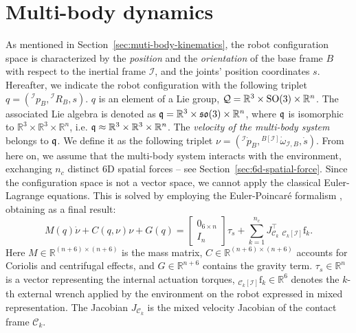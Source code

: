 \section{Multi-body dynamics}
\label{sec:multi-body-dynamics}
As mentioned in Section~\ref{sec:muti-body-kinematics}, the robot configuration space is characterized by the \emph{position} and the \emph{orientation} of the base frame $B$ with respect to the inertial frame $\mathcal{I}$, and the joints' position coordinates $s$. Hereafter, we indicate the robot configuration with the following triplet $q = ({}^{\mathcal{I}} p_B, {}^{\mathcal{I}} R_{B}, s)$. $q$ is an element of a Lie group, $\mathcal{Q} = \mathbb{R}^3 \times \mathrm{SO}(3) \times \mathbb{R}^n$. The associated Lie algebra is denoted as $\mathfrak{q} = \mathbb{R}^3 \times \mathfrak{so}(3) \times \mathbb{R}^n$, where $\mathfrak{q}$ is isomorphic to $\mathbb{R}^3 \times \mathbb{R}^3 \times \mathbb{R}^n$, i.e. $\mathfrak{q} \approx\mathbb{R}^3 \times \mathbb{R}^3 \times \mathbb{R}^n$. The \emph{velocity of the multi-body system} belongs to $\mathfrak{q}$. We define it as the following triplet $\nu = \left({}^{\mathcal{I}} \dot{p}_B, {}^{B[\mathcal{I}]}\dot{\omega}_{\mathcal{I}, B}, \dot{s}\right)$.
From here on, we assume that the multi-body system interacts with the environment, exchanging $n_c$ distinct 6D spatial forces -- see Section~\ref{sec:6d-spatial-force}. Since the configuration space is not a vector space, we cannot apply the classical Euler-Lagrange equations. This is solved by employing the Euler-Poincar\'e formalism \citep[Chapter 13.5]{Marsden2010}, obtaining as a final result:
\begin{equation}
\label{eq:system_initial}
M(q)\dot{\nu} + C(q, \nu)\nu + G(q) =  \begin{bmatrix}
0_{6\times n} \\ I_n
\end{bmatrix}\tau_s + \sum_{k = 1}^{n_c} J^\top_{\mathcal{C}_k} \; {}_{\mathcal{C}_k[\mathcal{I}]}\mathrm{f}_k.
\end{equation}
Here $M\in \mathbb{R}^{(n+6) \times (n+6)}$ is the mass matrix, $C \in \mathbb{R}^{(n+6) \times (n+6)}$ accounts for Coriolis and centrifugal effects, and $G \in \mathbb{R}^{n+6}$ contains the gravity term. $\tau_s \in \mathbb{R}^{n}$ is a vector representing the internal actuation torques, ${}_{\mathcal{C}_k[\mathcal{I}]}\mathrm{f}_k \in \mathbb{R}^{6}$ denotes the $k$-th external wrench applied by the environment on the robot expressed in mixed representation.
The Jacobian $J_{\mathcal{C}_k}$ is the mixed velocity Jacobian of the contact frame $\mathcal{C}_k$.
